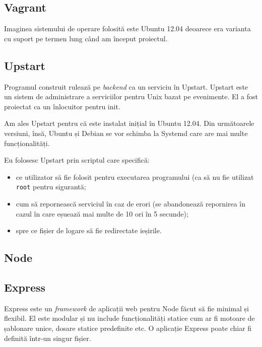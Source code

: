 \documentclass[a4wide,12pt]{report}
\newcommand{\eng}[1]{\emph{#1}} %
\newcommand{\cod}[1]{\texttt{#1}}
\begin{document}
\subsection{Vagrant}

Imaginea sistemului de operare folosită este Ubuntu 12.04 deoarece era varianta
cu suport pe termen lung când am început proiectul.

\subsection{Upstart}

Programul construit rulează pe \eng{backend} ca un serviciu în Upstart. Upstart
este un sistem de administrare a serviciilor pentru Unix bazat pe evenimente. El
a fost proiectat ca un înlocuitor pentru init.

Am ales Upstart pentru că este instalat inițial în Ubuntu 12.04. Din următoarele
versiuni, însă, Ubuntu și Debian se vor schimba la Systemd care are mai multe
funcționalități.

Eu folosesc Upstart prin scriptul care specifică:

\begin{itemize}

\item ce utilizator să fie folosit pentru executarea programului (ca să nu fie
utilizat \cod{root} pentru sigurantă;

\item cum să repornească serviciul în caz de erori (se abandonează repornirea în
cazul în care eșuează mai multe de 10 ori în 5 secunde);

\item spre ce fișier de logare să fie redirectate ieșirile.

\end{itemize}

\subsection{Node}

\subsection{Express}

Express este un \eng{framework} de aplicații web pentru Node făcut să fie
minimal și flexibil. El este modular și nu include funcționalități statice cum
ar fi motoare de șablonare unice, dosare statice predefinite etc. O aplicație
Express poate chiar fi definită într-un singur fișier.
\end{document}
